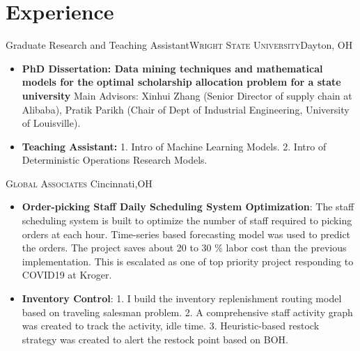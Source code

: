 \documentclass[12pt,letterpaper,roman]{moderncv} %
\begin{document}
\section{Experience}
 {Graduate Research and Teaching
Assistant}{\textsc{Wright State University}}{Dayton, OH}{}{
\begin{itemize}
\item \textbf{PhD Dissertation: Data mining techniques and mathematical models for the optimal scholarship allocation problem for a state university}
\newline 
Main Advisors: Xinhui Zhang (Senior Director of supply chain at Alibaba), Pratik Parikh (Chair of Dept of Industrial Engineering, University of Louisville).
\item \textbf{Teaching Assistant:}
1. Intro of Machine Learning Models. 
2. Intro of Deterministic Operations Research Models.
\end{itemize} }

\bigskip

{\textsc{Global Associates} }{Cincinnati,OH}{}{}{
\begin{itemize}
\item \textbf{Order-picking Staff Daily Scheduling System Optimization}: 
The staff scheduling system is built to optimize the number of staff required to picking 
orders at each hour. Time-series based forecasting model was used to predict the orders. 
The project saves about  20 to 30 \% labor cost than the previous implementation. 
This is escalated as one of top priority project responding to COVID19 at Kroger.

\item \textbf{Inventory Control}:
1. I build the inventory replenishment routing model based on traveling salesman problem. 
2. A comprehensive staff activity graph was created to track the activity, idle time. 
3. Heuristic-based restock strategy was created to alert the restock point based on BOH.


\end{itemize}
}

\bigskip
\end{document}
